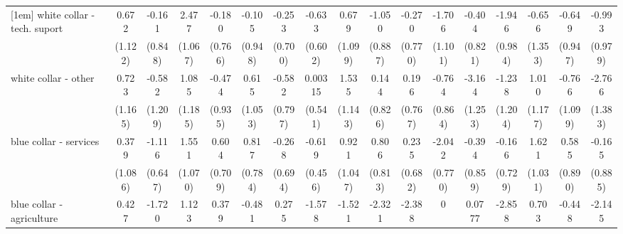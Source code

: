 {\begin{tabular}{l*{16}{c}}
[1em]
white collar - tech. suport&       0.672         &      -0.161         &       2.477\sym{*}  &      -0.180         &      -0.105         &      -0.253         &      -0.633         &       0.679         &      -1.050         &      -0.270         &      -1.706         &      -0.404         &      -1.946\sym{*}  &      -0.656         &      -0.649         &      -0.993         \\
                    &     (1.122)         &     (0.848)         &     (1.067)         &     (0.766)         &     (0.948)         &     (0.700)         &     (0.602)         &     (1.099)         &     (0.887)         &     (0.770)         &     (1.101)         &     (0.821)         &     (0.984)         &     (1.353)         &     (0.947)         &     (0.979)         \\
[1em]
white collar - other&       0.723         &      -0.582         &       1.085         &      -0.474         &       0.615         &      -0.582         &     0.00315         &       1.535         &       0.144         &       0.196         &      -0.764         &      -3.164\sym{*}  &      -1.238         &       1.010         &      -0.766         &      -2.766\sym{*}  \\
                    &     (1.165)         &     (1.209)         &     (1.185)         &     (0.935)         &     (1.053)         &     (0.797)         &     (0.541)         &     (1.143)         &     (0.826)         &     (0.767)         &     (0.864)         &     (1.253)         &     (1.204)         &     (1.177)         &     (1.099)         &     (1.383)         \\
[1em]
blue collar - services&       0.379         &      -1.116         &       1.551         &       0.604         &       0.817         &      -0.268         &      -0.619         &       0.921         &       0.806         &       0.235         &      -2.042\sym{**} &      -0.394         &      -0.166         &       1.621         &       0.585         &      -0.165         \\
                    &     (1.086)         &     (0.647)         &     (1.070)         &     (0.709)         &     (0.784)         &     (0.694)         &     (0.456)         &     (1.047)         &     (0.813)         &     (0.682)         &     (0.770)         &     (0.859)         &     (0.729)         &     (1.031)         &     (0.890)         &     (0.885)         \\
[1em]
blue collar - agriculture&       0.427         &      -1.720         &       1.123         &       0.379         &      -0.481         &       0.275         &      -1.578         &      -1.521         &      -2.321         &      -2.388\sym{*}  &           0         &      0.0777         &      -2.858\sym{*}  &       0.703         &      -0.448         &      -2.145         \\

\end{tabular}}
